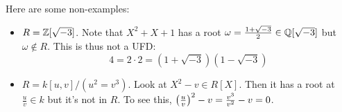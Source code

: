 \begin{example}
    Here are some non-examples:
    \begin{itemize}
        \item $R = \operatorname{\mathbb{Z}}[\sqrt{-3}]$. Note that $X^2 + X + 1$ has a root $\omega = \frac{1 + \sqrt{-3}}{2} \in \operatorname{\mathbb{Q}}[\sqrt{-3}]$
        but $\omega \notin R$. This is thus not a UFD:
        \[ 4 = 2 \cdot 2 = (1 + \sqrt{-3})(1 - \sqrt{-3}) \]
        \item $R = k[u,v]/(u^2 = v^3)$. Look at $X^2 - v \in R[X]$. Then it has a root at $\frac{u}{v} \in k$
        but it's not in $R$. To see this, $\qty(\frac{u}{v})^2 - v = \frac{v^3}{v^2} - v = 0$.
    \end{itemize}
    
\end{example}